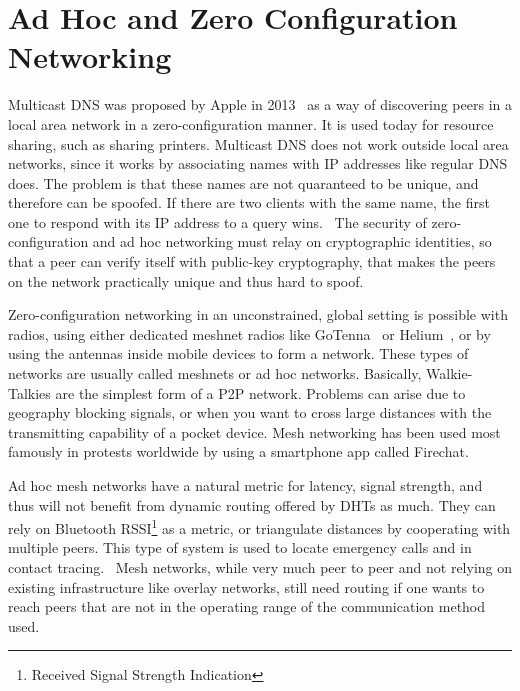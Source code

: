 \section{Ad Hoc and Zero Configuration Networking}
Multicast DNS was proposed by Apple in 2013~\cite{Cheshire2013-ja} as a way of discovering peers in a local area network in a zero-configuration manner. It is used today for resource sharing, such as sharing printers. Multicast DNS does not work outside local area networks, since it works by associating names with IP addresses like regular DNS does. The problem is that these names are not quaranteed to be unique, and therefore can be spoofed. If there are two clients with the same name, the first one to respond with its IP address to a query wins.~\cite{Pdp2008-tg} The security of zero-configuration and ad hoc networking must relay on cryptographic identities, so that a peer can verify itself with public-key cryptography, that makes the peers on the network practically unique and thus hard to spoof.

Zero-configuration networking in an unconstrained, global setting is possible with radios, using either dedicated meshnet radios like GoTenna~\cite{GoTenna_undated-km} or Helium~\cite{Helium_undated-jv}, or by using the antennas inside mobile devices to form a network. These types of networks are usually called meshnets or ad hoc networks. Basically, Walkie-Talkies are the simplest form of a P2P network. Problems can arise due to geography blocking signals, or when you want to cross large distances with the transmitting capability of a pocket device. Mesh networking has been used most famously in protests worldwide by using a smartphone app called Firechat.~\cite{Milian2014-mt}

Ad hoc mesh networks have a natural metric for latency, signal strength, and thus will not benefit from dynamic routing offered by DHTs as much. They can rely on Bluetooth RSSI\footnote{Received Signal Strength Indication} as a metric, or triangulate distances by cooperating with multiple peers. This type of system is used to locate emergency calls and in contact tracing.~\cite{Biddle2020-kl} Mesh networks, while very much peer to peer and not relying on existing infrastructure like overlay networks, still need routing if one wants to reach peers that are not in the operating range of the communication method used.

